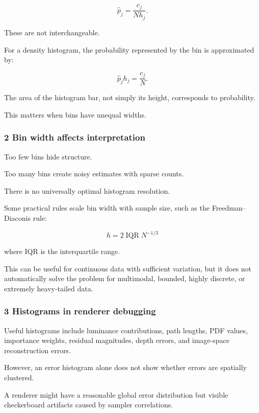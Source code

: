 \[
 \boxed{ \hat p_j= \frac{c_j}{Nh_j} }.
\]

These are not interchangeable.

For a density histogram, the probability represented by the bin is approximated by:

\[
 \hat p_jh_j=\frac{c_j}{N}.
\]

The area of the histogram bar, not simply its height, corresponds to probability.

This matters when bins have unequal widths.

\subsubsection{2 Bin width affects interpretation}\label{02-foundations-ii-ch030-bin-width-affects-interpretation}

\hypertarget{02-foundations-ii-ch030-bin-width-affects-interpretation}{}

Too few bins hide structure.

Too many bins create noisy estimates with sparse counts.

There is no universally optimal histogram resolution.

Some practical rules scale bin width with sample size, such as the Freedman--Diaconis rule:

\[
 \boxed{ h=2\operatorname{IQR}N^{-1/3} }
\]

where IQR is the interquartile range.

This can be useful for continuous data with sufficient variation, but it does not automatically solve the problem for multimodal, bounded, highly discrete, or extremely heavy-tailed data.

\subsubsection{3 Histograms in renderer debugging}\label{02-foundations-ii-ch030-histograms-in-renderer-debugging}

\hypertarget{02-foundations-ii-ch030-histograms-in-renderer-debugging}{}

Useful histograms include luminance contributions, path lengths, PDF values, importance weights, residual magnitudes, depth errors, and image-space reconstruction errors.

However, an error histogram alone does not show whether errors are spatially clustered.

A renderer might have a reasonable global error distribution but visible checkerboard artifacts caused by sampler correlations.

